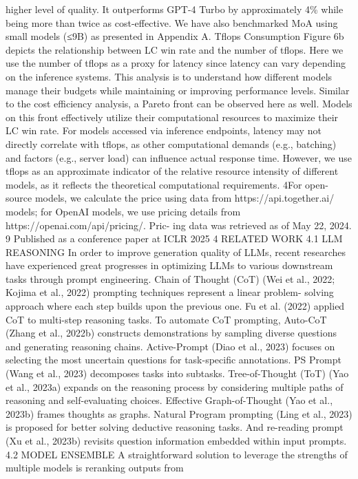 higher level of quality. It outperforms GPT-4 Turbo by approximately 4\% while being more than
twice as cost-effective. We have also benchmarked MoA using small models (≤9B) as presented in
Appendix A.
Tflops Consumption
Figure 6b depicts the relationship between LC win rate and the number of
tflops. Here we use the number of tflops as a proxy for latency since latency can vary depending on the
inference systems. This analysis is to understand how different models manage their budgets while
maintaining or improving performance levels. Similar to the cost efficiency analysis, a Pareto front
can be observed here as well. Models on this front effectively utilize their computational resources to
maximize their LC win rate. For models accessed via inference endpoints, latency may not directly
correlate with tflops, as other computational demands (e.g., batching) and factors (e.g., server load)
can influence actual response time. However, we use tflops as an approximate indicator of the relative
resource intensity of different models, as it reflects the theoretical computational requirements.
4For open-source models, we calculate the price using data from https://api.together.ai/
models; for OpenAI models, we use pricing details from https://openai.com/api/pricing/. Pric-
ing data was retrieved as of May 22, 2024.
9
Published as a conference paper at ICLR 2025
4
RELATED WORK
4.1
LLM REASONING
In order to improve generation quality of LLMs, recent researches have experienced great progresses
in optimizing LLMs to various downstream tasks through prompt engineering. Chain of Thought
(CoT) (Wei et al., 2022; Kojima et al., 2022) prompting techniques represent a linear problem-
solving approach where each step builds upon the previous one. Fu et al. (2022) applied CoT to
multi-step reasoning tasks. To automate CoT prompting, Auto-CoT (Zhang et al., 2022b) constructs
demonstrations by sampling diverse questions and generating reasoning chains. Active-Prompt (Diao
et al., 2023) focuses on selecting the most uncertain questions for task-specific annotations. PS
Prompt (Wang et al., 2023) decomposes tasks into subtasks. Tree-of-Thought (ToT) (Yao et al., 2023a)
expands on the reasoning process by considering multiple paths of reasoning and self-evaluating
choices. Effective Graph-of-Thought (Yao et al., 2023b) frames thoughts as graphs. Natural Program
prompting (Ling et al., 2023) is proposed for better solving deductive reasoning tasks. And re-reading
prompt (Xu et al., 2023b) revisits question information embedded within input prompts.
4.2
MODEL ENSEMBLE
A straightforward solution to leverage the strengths of multiple models is reranking outputs from
